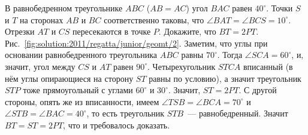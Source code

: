 \problem
В равнобедренном треугольнике $ABC$ ($AB = AC$) угол $BAC$ равен $40^\circ$.
Точки $S$ и $T$ на сторонах $AB$ и $BC$ соответственно таковы, что
$\angle BAT = \angle BCS = 10^\circ$.
Отрезки $AT$ и $CS$ пересекаются в точке $P$.
Докажите, что $BT = 2 PT$.
%
\label{solution:2011/regatta/junior/geomt/2}%
Рис.~\ref{fig:solution:2011/regatta/junior/geomt/2}.
Заметим, что углы при основании равнобедренного треугольника $ABC$ равны
$70^\circ$.
Тогда $\angle SCA = 60^\circ$, и, значит, угол между $CS$ и $AT$ равен
$90^\circ$.
Четырехугольник $STCA$ вписанный
(в нём углы опирающиеся на сторону $ST$ равны по условию),
а значит треугольник $STP$ тоже прямоугольный с углами $60^\circ$ и $30^\circ$.
Значит, $ST = 2 PT$.
С другой стороны, опять же из вписанности, имеем
$\angle TSB = \angle BCA = 70^\circ$ и
$\angle STB = \angle BAC = 40^\circ$,
то есть треугольник $STB$~--- равнобедренный.
Значит $BT = ST = 2 PT$, что и требовалось доказать.
\endproblem
